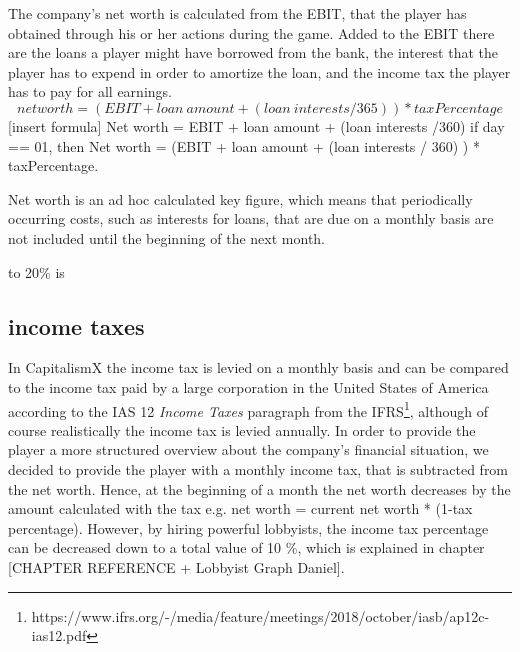 The company’s net worth is calculated from the EBIT, that the player has obtained through his or her actions during the game. Added to the EBIT there are the loans a player might have borrowed from the bank, the interest that the player has to expend in order to amortize the loan, and the income tax the player has to pay for all earnings. \\
$$net worth= (EBIT+loan\ amount+(loan\ interests/365))* taxPercentage$$
[insert formula]
Net worth = EBIT + loan amount + (loan interests /360) if day == 01, then Net worth = (EBIT + loan amount + (loan interests / 360) ) * taxPercentage.

Net worth is an ad hoc calculated key figure, which means that periodically occurring costs, such as interests for loans, that are due on a monthly basis are not included until the beginning of the next month. 

 to 20\% is
 
\subsection{income taxes}
In CapitalismX the income tax is levied on a monthly basis and can be compared to the income tax paid by a large corporation in the United States of America according to the IAS 12 \textit{Income Taxes} paragraph from the IFRS\footnote{https://www.ifrs.org/-/media/feature/meetings/2018/october/iasb/ap12c-ias12.pdf}, although of course realistically the income tax is levied annually. In order to provide the player a more structured overview about the company’s financial situation, we decided to provide the player with a monthly income tax, that is subtracted from the net worth. Hence, at the beginning of a month the net worth decreases by the amount calculated with the tax e.g. net worth = current net worth * (1-tax percentage). However, by hiring powerful lobbyists, the income tax percentage can be decreased down to a total value of 10 \%, which is explained in chapter [CHAPTER REFERENCE + Lobbyist Graph Daniel].


